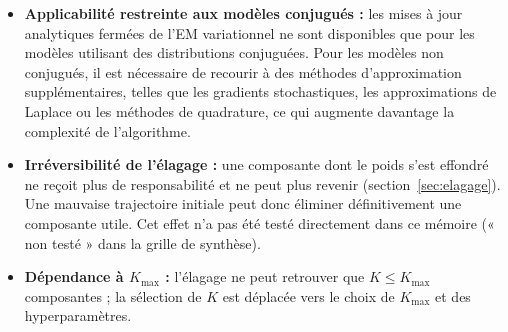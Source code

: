 \begin{itemize}
\item \textbf{Applicabilité restreinte aux modèles conjugués : }les mises à jour analytiques fermées de l'EM variationnel ne sont disponibles que pour les modèles utilisant des distributions conjuguées. Pour les modèles non conjugués, il est nécessaire de recourir à des méthodes d'approximation supplémentaires, telles que les gradients stochastiques, les approximations de Laplace ou les méthodes de quadrature, ce qui augmente davantage la complexité de l'algorithme.
\item \textbf{Irréversibilité de l'élagage : }une composante dont le poids s'est effondré ne reçoit plus de responsabilité et ne peut plus revenir (section~\ref{sec:elagage}). Une mauvaise trajectoire initiale peut donc éliminer définitivement une composante utile. Cet effet n'a pas été testé directement dans ce mémoire (« non testé » dans la grille de synthèse).
\item \textbf{Dépendance à $K_{\max}$ : }l'élagage ne peut retrouver que $K \leq K_{\max}$ composantes ; la sélection de $K$ est déplacée vers le choix de $K_{\max}$ et des hyperparamètres.

\end{itemize}
